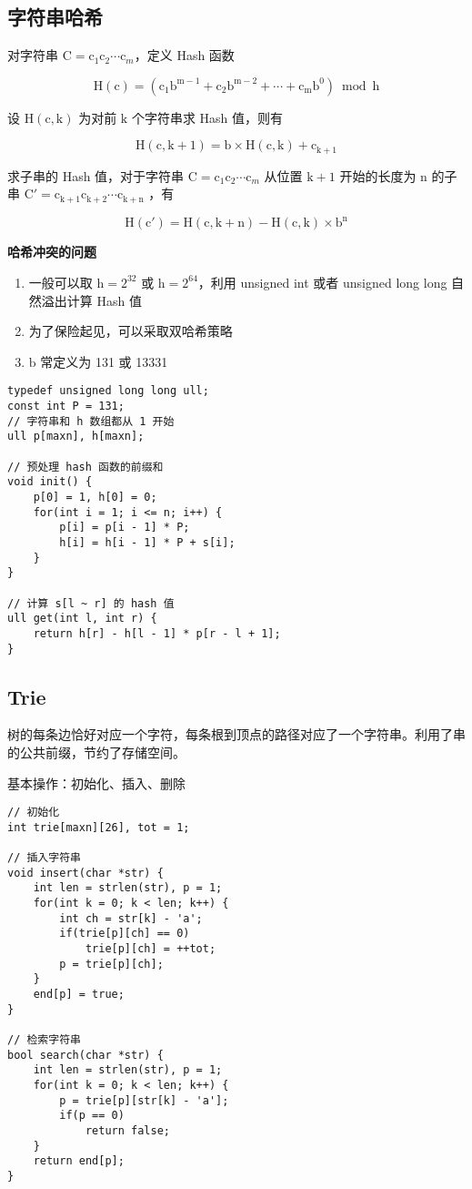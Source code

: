 \documentclass[UTF8]{article}
\begin{document}
\subsection{字符串哈希}
对字符串 $\text{C} = \text{c}_1\text{c} _2\cdots \text{c}_m$，定义 Hash 函数

$$
\mathrm{H(c) = (c_1b^{m-1}+c_2b^{m-2}+\cdots+c_mb^0) \bmod h} 
$$

设 $\mathrm{H(c, k)}$ 为对前 $\mathrm{k}$ 个字符串求 Hash 值，则有

$$
\mathrm{H(c, k+1) = b \times H(c, k) + c_{k + 1}}
$$

求子串的 Hash 值，对于字符串 $\text{C} = \text{c}_1\text{c} _2\cdots \text{c}_m$ 从位置 $\mathrm{k+1}$ 开始的长度为 $\mathrm{n}$ 的子串 $\mathrm{C' = c_{k+1}c_{k+2} \cdots c_{k+n} }$ ，有

$$
\mathrm{H(c') = H(c, k + n) - H(c, k) \times b^n}
$$

\noindent \textbf{哈希冲突的问题}

\begin{enumerate}
	\item 一般可以取 $\mathrm{h = 2 ^ {32}}$ 或 $\mathrm{h = 2^{64}}$，利用 unsigned int 或者 unsigned long long 自然溢出计算 Hash 值
	\item 为了保险起见，可以采取双哈希策略
	\item $\mathrm{b}$ 常定义为 131 或 13331
\end{enumerate}

\begin{lstlisting}[caption=字符串哈希]
typedef unsigned long long ull;
const int P = 131;
// 字符串和 h 数组都从 1 开始
ull p[maxn], h[maxn];

// 预处理 hash 函数的前缀和
void init() {
	p[0] = 1, h[0] = 0;
	for(int i = 1; i <= n; i++) {
		p[i] = p[i - 1] * P;
		h[i] = h[i - 1] * P + s[i]; 
	}
}

// 计算 s[l ~ r] 的 hash 值
ull get(int l, int r) {
	return h[r] - h[l - 1] * p[r - l + 1];
}
\end{lstlisting}



\subsection{Trie}
树的每条边恰好对应一个字符，每条根到顶点的路径对应了一个字符串。利用了串的公共前缀，节约了存储空间。

基本操作：初始化、插入、删除

\begin{lstlisting}[caption=Trie]
// 初始化
int trie[maxn][26], tot = 1;

// 插入字符串
void insert(char *str) {
	int len = strlen(str), p = 1;
	for(int k = 0; k < len; k++) {
		int ch = str[k] - 'a';
		if(trie[p][ch] == 0)
			trie[p][ch] = ++tot;
		p = trie[p][ch];
	}
	end[p] = true;
}

// 检索字符串
bool search(char *str) {
	int len = strlen(str), p = 1;
	for(int k = 0; k < len; k++) {
		p = trie[p][str[k] - 'a'];
		if(p == 0)
			return false;
	}
	return end[p];
}
\end{lstlisting}
\end{document}
